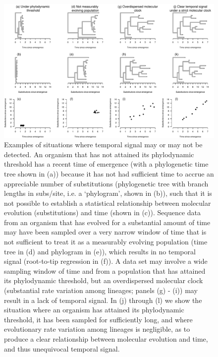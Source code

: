 \documentclass[11pt]{article}
\begin{document}
\begin{landscape}
	\begin{figure}[H]
		\begin{center}
			\includegraphics[scale=0.55, angle=0]{examples_temp_signal_thresholds_meps.pdf}
			\caption{Examples of situations where temporal signal may or may not be detected. An organism that has not attained its phylodynamic threshold has a recent time of emergence (with a phylogenetic time tree shown in (a)) because it has not had sufficient time to accrue an appreciable number of substitutions (phylogenetic tree with branch lengths in subs/site, i.e. a `phylogram', shown in (b)), such that it is not possible to establish a statistical relationship between molecular evolution (substitutions) and time (shown in (c)). Sequence data from an organism that has evolved for a substantial amount of time may have been sampled over a very narrow window of time that is not sufficient to treat it as a measurably evolving population (time tree in (d) and phylogram in (e)), which results in no temporal signal (root-to-tip regression in (f)). A data set may involve a wide sampling window of time and from a population that has attained its phylodynamic threshold, but an overdispersed molecular clock (substantial rate variation among lineages; panels (g) - (i)) may result in a lack of temporal signal. In (j) through (l) we show the situation where an organism has attained its phylodynamic threshold, it has been sampled for sufficiently long, and where evolutionary rate variation among lineages is negligible, as to produce a clear relationship between molecular evolution and time, and thus unequivocal temporal signal.}
			\label{figure:Fig1}
		\end{center}
	\end{figure}
\end{landscape}
\end{document}
